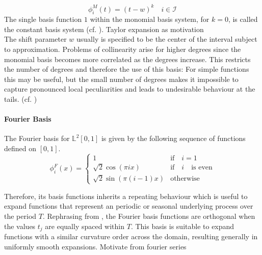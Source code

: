 \documentclass[11pt,twoside,a4paper]{article}
\begin{document}
	\begin{equation}
		\phi_{i}^{M}(t) = (t-w)^k \quad i \in \mathcal{I}
	\end{equation}
	The single basis function $1$ within the monomial basis system, for $k=0$, is called the constant basis system (cf. \cite{horvath_inference_2012}). {\color{blue} Taylor expansion as motivation}\\ 
	The shift parameter $w$ usually is specified to be the center of the interval subject to approximation.
	 Problems of collinearity arise for higher degrees since the monomial basis becomes more correlated as the degrees increase. This restricts the number of degrees and therefore the use of this basis: For simple functions this may be useful, but the small number of degrees makes it impossible to capture pronounced local peculiarities and leads to undesirable behaviour at the tails. (cf. \cite{ramsay_functional_2005})


	
	\paragraph{Fourier Basis}
	The Fourier basis for $\mathbb{L}^2[0,1]$ is given by the following sequence of functions defined on $[0,1]$.
	\begin{equation}
		\phi_{i}^{F}(x) = 
		\begin{cases}
			1 & \text{if} \quad i = 1\\
			\sqrt{2} \cos(\pi i x) & \text{if} \quad i \quad \text{is even} \\
			\sqrt{2} \sin(\pi (i-1)x) & \text{otherwise}
		\end{cases}
	\end{equation}
	
	Therefore, its basis functions inherits a repeating behaviour which is useful to expand functions that represent an periodic or seasonal underlying process over the period $T$. Rephrasing from \cite{ramsay_functional_2005}, the Fourier basis functions are orthogonal when the values $t_j$ are equally spaced within $T$. This basis is suitable to expand functions with a similar curvature order across the domain, resulting generally in uniformly smooth expansions.  {\color{blue} Motivate from fourier series}
\end{document}
